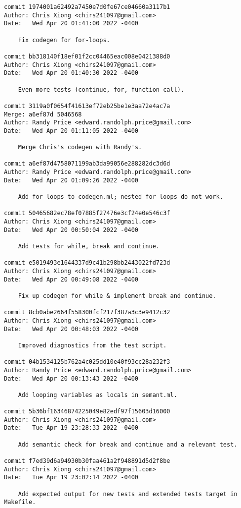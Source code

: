 {\begin{verbatim}
commit 1974001a62492a7450e7d0fe67ce04660a3117b1
Author: Chris Xiong <chirs241097@gmail.com>
Date:   Wed Apr 20 01:41:00 2022 -0400

    Fix codegen for for-loops.

commit bb318140f18ef01f2cc04465eac008e0421388d0
Author: Chris Xiong <chirs241097@gmail.com>
Date:   Wed Apr 20 01:40:30 2022 -0400

    Even more tests (continue, for, function call).

commit 3119a0f0654f41613ef72eb25be1e3aa72e4ac7a
Merge: a6ef87d 5046568
Author: Randy Price <edward.randolph.price@gmail.com>
Date:   Wed Apr 20 01:11:05 2022 -0400

    Merge Chris's codegen with Randy's.

commit a6ef87d4758071199ab3da99056e288282dc3d6d
Author: Randy Price <edward.randolph.price@gmail.com>
Date:   Wed Apr 20 01:09:26 2022 -0400

    Add for loops to codegen.ml; nested for loops do not work.

commit 50465682ec78ef07885f27476e3cf24e0e546c3f
Author: Chris Xiong <chirs241097@gmail.com>
Date:   Wed Apr 20 00:50:04 2022 -0400

    Add tests for while, break and continue.

commit e5019493e1644337d9c41b298bb2443022fd723d
Author: Chris Xiong <chirs241097@gmail.com>
Date:   Wed Apr 20 00:49:08 2022 -0400

    Fix up codegen for while & implement break and continue.

commit 8cb0abe2664f558300fcf217f387a3c3e9412c32
Author: Chris Xiong <chirs241097@gmail.com>
Date:   Wed Apr 20 00:48:03 2022 -0400

    Improved diagnostics from the test script.

commit 04b1534125b762a4c025dd10e40f93cc28a232f3
Author: Randy Price <edward.randolph.price@gmail.com>
Date:   Wed Apr 20 00:13:43 2022 -0400

    Add looping variables as locals in semant.ml.

commit 5b36bf16346874225049e82edf97f15603d16000
Author: Chris Xiong <chirs241097@gmail.com>
Date:   Tue Apr 19 23:28:33 2022 -0400

    Add semantic check for break and continue and a relevant test.

commit f7ed39d6a94930b30faa461a2f948891d5d2f8be
Author: Chris Xiong <chirs241097@gmail.com>
Date:   Tue Apr 19 23:02:14 2022 -0400

    Add expected output for new tests and extended tests target in Makefile.


\end{verbatim}}
